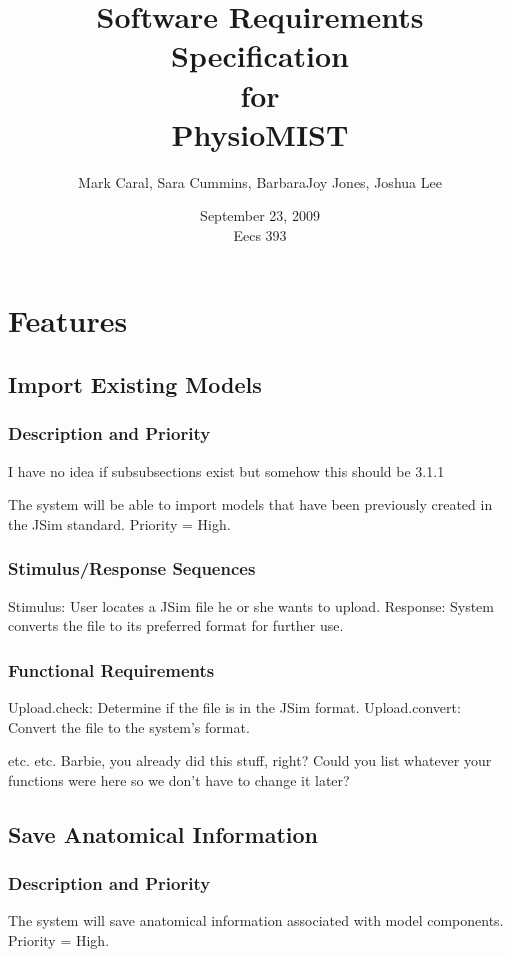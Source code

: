 \documentclass{article}
\title{Software Requirements Specification\\
\bigskip
{\large for}\\
\bigskip
PhysioMIST}
\author{Mark Caral, Sara Cummins, BarbaraJoy Jones, Joshua Lee}
\date{September 23, 2009\\{\sc Eecs} 393}
\begin{document}
\begin{titlepage}
\maketitle
\end{titlepage}

\tableofcontents
\newpage

\section{Features}
\subsection{Import Existing Models}

\subsubsection{Description and Priority}
I have no idea if subsubsections exist but somehow this should be 3.1.1


The system will be able to import models that have been previously created in the JSim standard.  Priority = High.

\subsubsection{Stimulus/Response Sequences}

Stimulus: User locates a JSim file he or she wants to upload.
Response: System converts the file to its preferred format for further use.

\subsubsection{Functional Requirements}
Upload.check: Determine if the file is in the JSim format.
Upload.convert: Convert the file to the system's format.

etc. etc. Barbie, you already did this stuff, right?  Could you list whatever your functions were here so we don't have to change it later?


\subsection{Save Anatomical Information}
\subsubsection{Description and Priority}
The system will save anatomical information associated with model components.  Priority = High.
\end{document}

